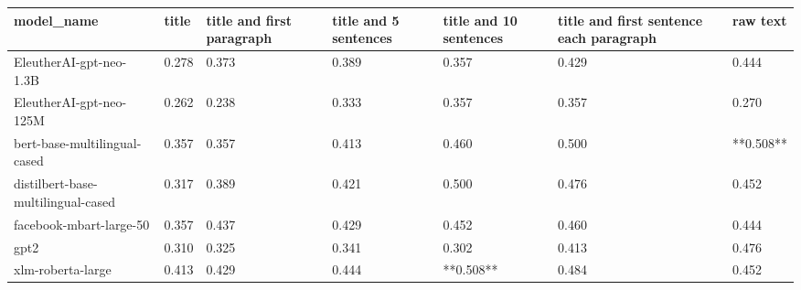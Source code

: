 \begin{tabular}{lllllll}
\toprule
                        model\_name & title & title and first paragraph & title and 5 sentences & title and 10 sentences & title and first sentence each paragraph &  raw text \\
\midrule
           EleutherAI-gpt-neo-1.3B & 0.278 &                     0.373 &                 0.389 &                  0.357 &                                   0.429 &     0.444 \\
           EleutherAI-gpt-neo-125M & 0.262 &                     0.238 &                 0.333 &                  0.357 &                                   0.357 &     0.270 \\
      bert-base-multilingual-cased & 0.357 &                     0.357 &                 0.413 &                  0.460 &                                   0.500 & **0.508** \\
distilbert-base-multilingual-cased & 0.317 &                     0.389 &                 0.421 &                  0.500 &                                   0.476 &     0.452 \\
           facebook-mbart-large-50 & 0.357 &                     0.437 &                 0.429 &                  0.452 &                                   0.460 &     0.444 \\
                              gpt2 & 0.310 &                     0.325 &                 0.341 &                  0.302 &                                   0.413 &     0.476 \\
                 xlm-roberta-large & 0.413 &                     0.429 &                 0.444 &              **0.508** &                                   0.484 &     0.452 \\
\bottomrule
\end{tabular}
